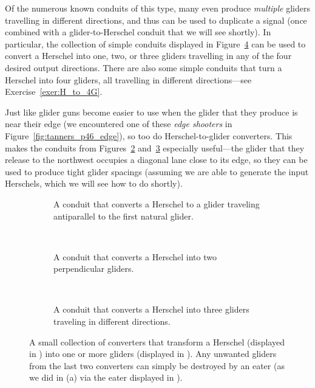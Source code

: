 Of the numerous known conduits of this type, many even produce \emph{multiple} gliders travelling in different directions, and thus can be used to duplicate a signal (once combined with a glider-to-Herschel conduit that we will see shortly). In particular, the collection of simple conduits displayed in Figure~\ref{fig:herschel_to_glider} can be used to convert a Herschel into one, two, or three gliders travelling in any of the four desired output directions. There are also some simple conduits that turn a Herschel into four gliders, all travelling in different directions---see Exercise~\ref{exer:H_to_4G}.

Just like glider guns become easier to use when the glider that they produce is near their edge (we encountered one of these \emph{edge shooters} in Figure~\ref{fig:tanners_p46_edge}), so too do Herschel-to-glider converters. This makes the conduits from Figures~\ref{fig:H_to_2G} and~\ref{fig:H_to_3G} especially useful---the glider that they release to the northwest occupies a diagonal lane close to its edge, so they can be used to produce tight glider spacings (assuming we are able to generate the input Herschels, which we will see how to do shortly).

\begin{figure}[!htb]
	\centering
	\begin{subfigure}{.315\textwidth}
		\centering\vspace*{1.23cm}
		\caption{A conduit that converts a Herschel to a glider traveling antiparallel to the first natural glider.}
		\label{fig:H_to_G}
	\end{subfigure} \ \ \ %
	\begin{subfigure}{.315\textwidth}
		\centering{}
		\caption{A conduit that converts a Herschel into two perpendicular gliders.}
		\label{fig:H_to_2G}
	\end{subfigure} \ \ \ %
	\begin{subfigure}{.315\textwidth}
		\centering{}
		\caption{A conduit that converts a Herschel into three gliders traveling in different directions.}
		\label{fig:H_to_3G}
	\end{subfigure}
	\caption{A small collection of converters that transform a Herschel (displayed in ) into one or more gliders (displayed in ). Any unwanted gliders from the last two converters can simply be destroyed by an eater (as we did in (a) via the eater displayed in ).}\label{fig:herschel_to_glider}
\end{figure}

